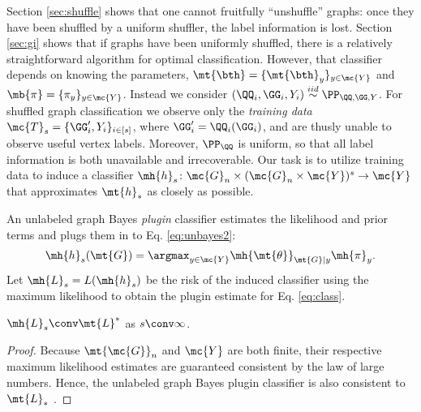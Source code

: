 \documentclass[10pt,journal,cspaper,compsoc]{IEEEtran}
\begin{document}
Section \ref{sec:shuffle} shows that one cannot fruitfully ``unshuffle'' graphs: once they have been shuffled by a uniform shuffler, the label information is lost.  Section \ref{sec:gi} shows that if graphs have been uniformly shuffled, there is a relatively straightforward algorithm for optimal classification. However, that classifier depends on knowing the parameters, $\mt{\bth}=\{\mt{\bth}_y\}_{y\in \mc{Y}}$ and $\mb{\pi}=\{\pi_y\}_{y \in \mc{Y}}$. Instead we consider  $(\QQ_i,\GG_i,Y_i)\overset{iid}{\sim}\PP_{\QQ,\GG,Y}$.  For shuffled graph classification we observe only the \emph{training data} $\mc{T}_s=\{\GG_i',Y_i\}_{i \in [s]}$, where $\GG_i'=\QQ_i(\GG_i)$, and are thusly unable to observe useful vertex labels.  Moreover, $\PP_{\QQ}$ is uniform, so that all label information is both unavailable and irrecoverable.  Our task is to utilize training data to induce a classifier $\mh{h}_s\colon \mc{G}_n \times (\mc{G}_n \times \mc{Y})^s \to \mc{Y}$ that approximates $\mt{h}_*$ as closely as possible.  

An unlabeled graph Bayes \emph{plugin} classifier estimates the likelihood and prior terms and plugs them in to Eq. \eqref{eq:unbayes2}:
\begin{align} \label{eq:class}
	\mh{h}_s(\mt{G})=\argmax_{y\in\mc{Y}} \mh{\mt{\theta}}_{\mt{G}|y}\mh{\pi}_y. %
\end{align}
Let $\mh{L}_s=L(\mh{h}_s)$ be the risk of the induced classifier using the maximum likelihood to obtain the plugin estimate for Eq. \eqref{eq:class}. 

\begin{thm} \label{thm:conv}
	$\mh{L}_s \conv \mt{L}^*$ as $s \conv \infty$.
\end{thm}

\begin{proof}
Because $\mt{\mc{G}}_n$ and $\mc{Y}$ are both finite, their respective maximum likelihood estimates are guaranteed consistent by the law of large numbers.  Hence,  the unlabeled graph Bayes plugin classifier is also consistent to $\mt{L}_*$ \cite{DEV96}.  %
\end{proof}


\end{document}

